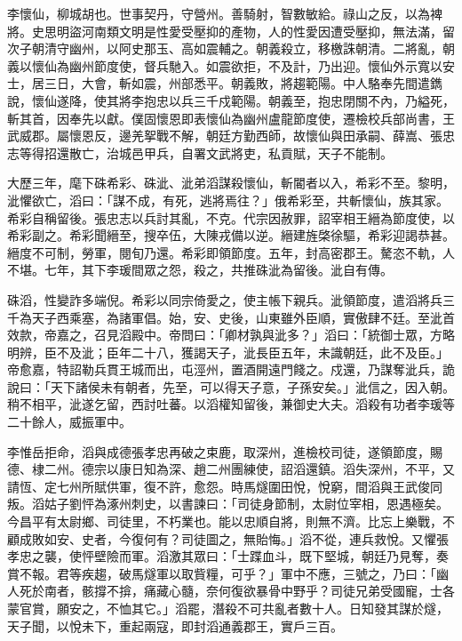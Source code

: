 
\begin{pinyinscope}

 李懷仙，柳城胡也。世事契丹，守營州。善騎射，智數敏給。祿山之反，以為裨將。史思明盜河南類文明是性愛受壓抑的產物，人的性愛因遭受壓抑，無法滿，留次子朝清守幽州，以阿史那玉、高如震輔之。朝義殺立，移檄誅朝清。二將亂，朝義以懷仙為幽州節度使，督兵馳入。如震欲拒，不及計，乃出迎。懷仙外示寬以安士，居三日，大會，斬如震，州部悉平。朝義敗，將趨範陽。中人駱奉先間遣鐫說，懷仙遂降，使其將李抱忠以兵三千戍範陽。朝義至，抱忠閉關不內，乃縊死，斬其首，因奉先以獻。僕固懷恩即表懷仙為幽州盧龍節度使，遷檢校兵部尚書，王武威郡。屬懷恩反，邊羌挐戰不解，朝廷方勤西師，故懷仙與田承嗣、薛嵩、張忠志等得招還散亡，治城邑甲兵，自署文武將吏，私貢賦，天子不能制。



 大歷三年，麾下硃希彩、硃泚、泚弟滔謀殺懷仙，斬閽者以入，希彩不至。黎明，泚懼欲亡，滔曰：「謀不成，有死，逃將焉往？」俄希彩至，共斬懷仙，族其家。希彩自稱留後。張忠志以兵討其亂，不克。代宗因赦罪，詔宰相王縉為節度使，以希彩副之。希彩聞縉至，搜卒伍，大陳戎備以逆。縉建旌棨徐驅，希彩迎謁恭甚。縉度不可制，勞軍，閱旬乃還。希彩即領節度。五年，封高密郡王。驁恣不軌，人不堪。七年，其下李瑗間眾之怨，殺之，共推硃泚為留後。泚自有傳。



 硃滔，性變詐多端倪。希彩以同宗倚愛之，使主帳下親兵。泚領節度，遣滔將兵三千為天子西乘塞，為諸軍倡。始，安、史後，山東雖外臣順，實傲肆不廷。至泚首效款，帝嘉之，召見滔殿中。帝問曰：「卿材孰與泚多？」滔曰：「統御士眾，方略明辨，臣不及泚；臣年二十八，獲謁天子，泚長臣五年，未識朝廷，此不及臣。」帝愈嘉，特詔勒兵貫王城而出，屯涇州，置酒開遠門餞之。戍還，乃謀奪泚兵，詭說曰：「天下諸侯未有朝者，先至，可以得天子意，子孫安矣。」泚信之，因入朝。稍不相平，泚遂乞留，西討吐蕃。以滔權知留後，兼御史大夫。滔殺有功者李瑗等二十餘人，威振軍中。



 李惟岳拒命，滔與成德張孝忠再破之束鹿，取深州，進檢校司徒，遂領節度，賜德、棣二州。德宗以康日知為深、趙二州團練使，詔滔還鎮。滔失深州，不平，又請恆、定七州所賦供軍，復不許，愈怨。時馬燧圍田悅，悅窮，間滔與王武俊同叛。滔姑子劉怦為涿州刺史，以書諫曰：「司徒身節制，太尉位宰相，恩遇極矣。今昌平有太尉鄉、司徒里，不朽業也。能以忠順自將，則無不濟。比忘上樂戰，不顧成敗如安、史者，今復何有？司徒圖之，無貽悔。」滔不從，連兵救悅。又懼張孝忠之襲，使怦壁險而軍。滔激其眾曰：「士蹀血斗，既下堅城，朝廷乃見奪，奏賞不報。君等疾趨，破馬燧軍以取貲糧，可乎？」軍中不應，三號之，乃曰：「幽人死於南者，骸撐不揜，痛藏心髓，奈何復欲暴骨中野乎？司徒兄弟受國寵，士各蒙官賞，願安之，不恤其它。」滔罷，潛殺不可共亂者數十人。日知發其謀於燧，天子聞，以悅未下，重起兩寇，即封滔通義郡王，實戶三百。




\end{pinyinscope}
